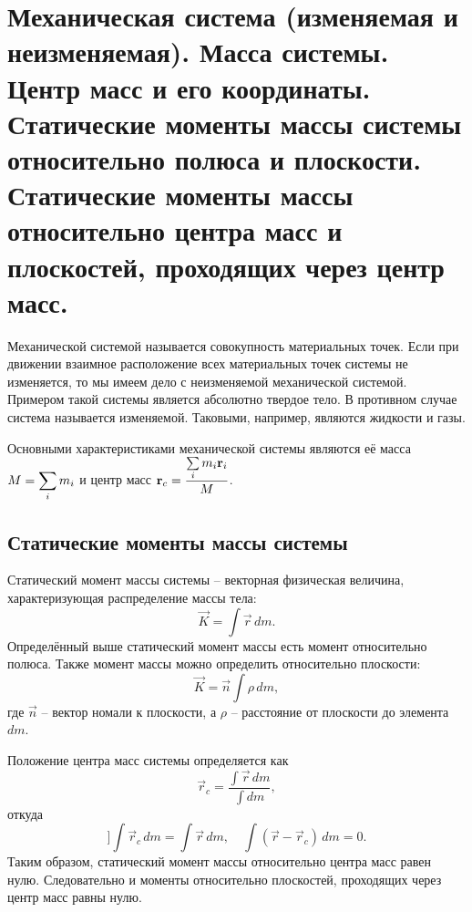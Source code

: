 \chapter{Механическая система (изменяемая и неизменяемая). Масса системы. Центр
масс и его координаты. Статические моменты массы системы относительно
полюса и плоскости. Статические моменты массы относительно центра масс и
плоскостей, проходящих через центр масс.}

Механической системой называется совокупность материальных точек. Если при
движении взаимное расположение всех материальных точек системы не изменяется, то
мы имеем дело с неизменяемой механической системой. Примером такой системы
является абсолютно твердое тело. В противном случае система называется
изменяемой. Таковыми, например, являются жидкости и газы.

Основными характеристиками механической системы являются её масса
\( \displaystyle M = \sum_i m_i \) и центр масс \( \displaystyle \boldsymbol{\mathrm{r}}_c =
\frac{\sum\limits_i m_i\boldsymbol{\mathrm{r}}_i}{M} \).

\section{Статические моменты массы системы}
Статический момент массы системы -- векторная физическая величина,
характеризующая распределение массы тела:
\[
    \vec{K} = \int \vec{r}\,dm.
\]
Определённый выше статический момент массы есть момент относительно полюса.
Также момент массы можно определить относительно плоскости:
\[
    \vec{K} = \vec{n}\int \rho\,dm,
\]
где \( \vec{n} \) -- вектор номали к плоскости, а \( \rho \) -- расстояние
от плоскости до элемента \( dm \).

Положение центра масс системы определяется как
\[
    \vec{r}_c = \frac{\int \vec{r}\,dm}{\int dm},
\]
откуда
\[]
    \int\vec{r}_c\,dm = \int \vec{r}\,dm,\quad
    \int(\vec{r} - \vec{r}_c)\,dm = 0.
\]
Таким образом, статический момент массы относительно центра масс равен нулю.
Следовательно и моменты относительно плоскостей, проходящих через центр масс
равны нулю.

\newpage %
